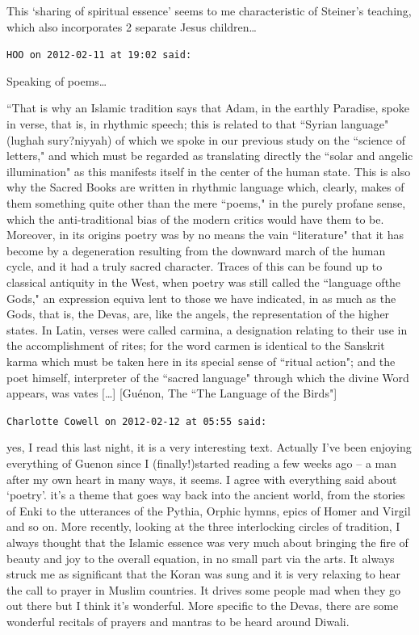 \begin{footnotesize}
\begin{sffamily}
This `sharing of spiritual essence' seems to me characteristic of Steiner's teaching, which also incorporates 2 separate Jesus children…


\hfill

\texttt{HOO on 2012-02-11 at 19:02 said: }

Speaking of poems… 

``That is why an Islamic tradition says that Adam, in the earthly Paradise, spoke in verse, that is, in rhythmic speech; this is related to that ``Syrian language" (lughah sury?niyyah) of which we spoke in our previous study on the ``science of letters," and which must be regarded as translating directly the ``solar and angelic illumination" as this manifests itself in the center of the human state. This is also why the Sacred Books are written in rhythmic language which, clearly, makes of them something quite other than the mere ``poems," in the purely profane sense, which the anti-traditional bias of the modern critics would have them to be. Moreover, in its origins poetry was by no means the vain ``literature" that it has become by a degeneration resulting from the downward march of the human cycle, and it had a truly sacred character. Traces of this can be found up to classical antiquity in the West, when poetry was still called the ``language ofthe Gods," an expression equiva lent to those we have indicated, in as much as the Gods, that is, the Devas, are, like the angels, the rep­resentation of the higher states. In Latin, verses were called carmina, a designation relating to their use in the accomplishment of rites; for the word carmen is identical to the Sanskrit karma which must be taken here in its special sense of ``ritual action"; and the poet him­self, interpreter of the ``sacred language" through which the divine Word appears, was vates […] [Guénon, The ``The Language of the Birds"]


\hfill

\texttt{Charlotte Cowell on 2012-02-12 at 05:55 said: }

yes, I read this last night, it is a very interesting text. Actually I've been enjoying everything of Guenon since I (finally!)started reading a few weeks ago – a man after my own heart in many ways, it seems. I agree with everything said about `poetry'. it's a theme that goes way back into the ancient world, from the stories of Enki to the utterances of the Pythia, Orphic hymns, epics of Homer and Virgil and so on. More recently, looking at the three interlocking circles of tradition, I always thought that the Islamic essence was very much about bringing the fire of beauty and joy to the overall equation, in no small part via the arts. It always struck me as significant that the Koran was sung and it is very relaxing to hear the call to prayer in Muslim countries. It drives some people mad when they go out there but I think it's wonderful. More specific to the Devas, there are some wonderful recitals of prayers and mantras to be heard around Diwali.


\end{sffamily}
\end{footnotesize}
